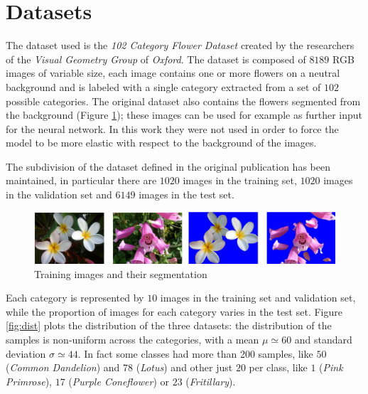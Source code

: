 \section{Datasets}
The dataset used is the \textit{102 Category Flower Dataset} \cite{Nilsback08} created by the researchers of the \textit{Visual Geometry Group} of \textit{Oxford}. The dataset is composed of $8189$ RGB images of variable size, each image contains one or more flowers on a neutral background and is labeled with a single category extracted from a set of $102$ possible categories. The original dataset also contains the flowers segmented from the background (Figure \ref{fig_dataset}); these images can be used for example as further input for the neural network. In this work they were not used in order to force the model to be more elastic with respect to the background of the images. \par
The subdivision of the dataset defined in the original publication has been maintained, in particular there are $1020$ images in the training set, $1020$ images in the validation set and $6149$ images in the test set.

\begin{figure}[ht!]
\centering  
\includegraphics[width=1.0\textwidth]{images/dataset.png} 
\caption{Training images and their segmentation}
\label{fig_dataset}
\end{figure}

Each category is represented by $10$ images in the training set and validation set, while the proportion of images for each category varies in the test set. Figure \ref{fig:dist} plots the distribution of the three datasets: the distribution of the samples is non-uniform across the categories, with a mean $\mu \simeq 60$ and standard deviation $\sigma \simeq 44$. In fact some classes had more than 200 samples, like  $50$ (\textit{Common Dandelion}) and $78$ (\textit{Lotus}) and other just $20$ per class, like $1$ (\textit{Pink Primrose}), $17$ (\textit{Purple Coneflower}) or $23$ (\textit{Fritillary}).

